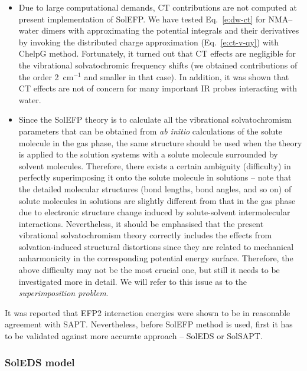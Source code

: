 \documentclass[a4paper,titlepage,twoside,fleqn,12pt]{book}
\begin{document}
\begin{refsection}
\begin{itemize}
 \item Due to
large computational demands, CT contributions are not computed at present implementation
of SolEFP. We have tested Eq.~\eqref{e:dw-ct} for NMA--water dimers 
with approximating the potential integrals and their derivatives by invoking the distributed
charge approximation (Eq.~\eqref{e:ct-v-qy}) with ChelpG method. \citep{Breneman.Wiberg.JCC.1990} 
Fortunately,
it turned out that CT effects are negligible for the vibrational solvatochromic frequency shifts
(we obtained contributions of the order 2~cm$^{-1}$ and smaller in that case). In addition, it was shown
that CT effects are not of concern 
for many important IR probes interacting with water. \citep{Lee.Choi.Cho.PCCP.2010,Blasiak.Cho.JCP.2014}
 \item Since the SolEFP theory is to calculate all the vibrational solvatochromism parameters 
that can be obtained from \emph{ab initio} calculations of the solute molecule in the gas phase, 
the same structure should be used when the theory is applied to the solution systems 
with a solute molecule surrounded by solvent molecules. Therefore, there exists a certain 
ambiguity (difficulty) in perfectly superimposing it onto the solute molecule in solutions 
-- note that the detailed molecular structures (bond lengths, bond angles, and so on) 
of solute molecules in solutions are slightly different from that in the gas phase 
due to electronic structure change induced by solute\hyp{}solvent intermolecular interactions. 
Nevertheless, it should be emphasised that the present vibrational solvatochromism theory 
correctly includes the effects from solvation\hyp{}induced structural distortions 
since they are related to mechanical anharmonicity in the corresponding potential 
energy surface. Therefore, the above difficulty may not be the most crucial one, 
but still it needs to be investigated more in detail. We will refer to this issue as to
the \emph{superimposition problem}.
\end{itemize}
%
It was reported that EFP2 interaction energies were shown to be
in reasonable agreement 
with SAPT. \citep{Flick.Kosenkov.Hohenstein.Sherrill.Slipchenko.JCTC.2012} 
Nevertheless, before SolEFP method is used, first it has to be validated
against more accurate approach -- SolEDS or SolSAPT. 

\subsubsection{SolEDS model\label{s:soleds}}


\end{refsection}
\end{document}
